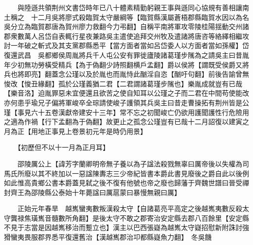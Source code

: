 　　與陸遜共領荆州文書岱時年已八十體素精勤躬親王事與遜同心協規有善相讓南土稱之　十二月吳將廖式殺臨賀太守嚴綱等【臨賀縣漢屬蒼梧郡縣臨賀水因以為名吳分立為臨賀郡唐為賀州廖力救翻今力弔翻】自稱平南將軍攻零陵桂陽揺動交州諸郡衆數萬人呂岱自表輒行星夜兼路吳主遣使追拜交州牧及遣諸將唐咨等絡繹相繼攻討一年破之斬式及其支黨郡縣悉平【當方面者當如呂岱委人以方面者當如孫權】岱復還武昌　吳都鄉侯周胤將兵千人屯公安有罪徙廬陵諸葛瑾步隲為之請吳主曰昔胤年少初無功勞橫受精兵【為于偽翻少詩照翻横戶孟翻】爵以侯將【謂既受侯爵又將兵也將即亮】翻蓋念公瑾以及於胤也而胤恃此酗淫自恣【酗吁句翻】前後告諭曾無悛改【悛丑緣翻】孤於公瑾義猶二君【二君謂諸葛瑾步隲也】樂胤成就豈有已哉【樂音洛】迫胤罪惡未宜便還且欲苦之使自知耳以公瑾之子而二君在中間苟使能改亦何患乎瑜兄子偏將軍峻卒全琮請使峻子護領其兵吳主曰昔走曹操拓有荆州皆是公瑾【事見六十五卷漢獻帝建安十三年】常不忘之初聞峻亡仍欲用護聞護性行危險用之適為作禍【行下孟翻為于偽翻】故更止之孤念公瑾豈有已哉十二月詔復以建寅之月為正【用地正事見上卷景初元年是時仍用景】

　　【初歷但不以十一月為正月耳】

　　邵陵厲公上【諱芳字蘭卿明帝無子養以為子諡法殺戮無辜曰厲帝後以失權為司馬氏所廢以其不終加以一惡諡陳夀志三少帝紀皆書本爵此書見廢後之爵自此以後例如此惟高貴鄉公書本爵蓋見弑之後不復有他號也帝之廢也歸藩于齊魏世譜曰晉受禪封齊王為邵陵縣公泰始十年薨諡曰厲扈蒙曰暴慢無親曰厲】

　　正始元年春旱　越嶲蠻夷數叛漢殺太守【自諸葛亮平高定之後越嶲夷數反殺太守龔禄焦璜嶲音髓數所角翻】是後太守不敢之郡寄治安定縣去郡八百餘里【安定縣不見于志當是因越嶲移治而蹔立也】漢主以巴西張嶷為越嶲太守嶷招慰新附誅討強猾蠻夷畏服郡界悉平復還舊治【漢越嶲郡治卭都縣嶷魚力翻】　冬吳饑

